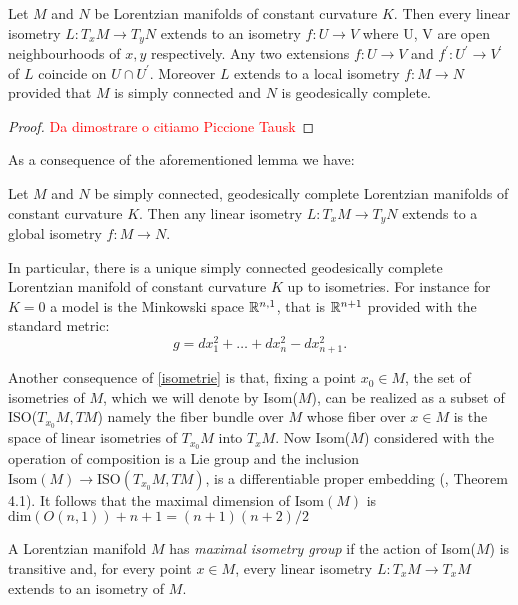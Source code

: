 \begin{lemma}\label{isometrie} Let $M$ and $N$ be Lorentzian manifolds of constant curvature $K$. Then every linear isometry $L:T_{x}M\to T_yN$ extends to an isometry $f:U\to V$ where U, V are open neighbourhoods of $x, y$ respectively. Any two extensions $f:U\to V$ and $f^{\prime}:U^{\prime} \to V^{\prime} $ of $L$ coincide on $U\cap U^{\prime}. $ Moreover $L$ extends to a local isometry $f:M\to N$ provided that $M$ is simply connected and $N$ is geodesically complete. 
\end{lemma}
\begin{proof}

\textcolor{red}{Da dimostrare o citiamo Piccione Tausk}  

\end{proof}

As a consequence of the aforementioned lemma we have: 
\begin{corollary}\label{122}
    Let $M$ and $N$ be simply connected, geodesically complete Lorentzian manifolds of constant curvature $K$. Then any linear isometry $L:T_xM\to T_yN$ extends to a global isometry $f:M\to N.$   
\end{corollary}

In particular, there is a unique simply connected geodesically complete Lorentzian manifold of constant curvature $K$ up to isometries. For instance for $K=0$ a model is the Minkowski space $\mathbb{R}^{n,1}$, that is $\mathbb{R}^{n+1}$ provided with the standard metric: 
\[
    g=dx_1^{2}+\dots+dx_n^{2}-dx_{n+1}^2.   
\]

Another consequence of \ref{isometrie} is that, fixing a point $x_0 \in M$, the set of isometries of $M$, which we will denote by Isom($M$), can be realized as a subset of ISO($T_{x_0}M, TM$) namely the fiber bundle over $M$ whose fiber over $x\in M$ is the space of linear isometries of $T_{x_0}M$ into $T_{x}M$. Now Isom($M$) considered with the operation of composition is a Lie group and the inclusion $\text{Isom}(M)\to \text{ISO}(T_{x_0}M, TM)$, is a differentiable proper embedding (\cite{okubo_1970}, Theorem 4.1). It follows that the maximal dimension of $\text{Isom}(M)$ is $\text{dim}(O(n,1))+n+1=(n+1)(n+2)/2$

\begin{definition}
    A Lorentzian manifold $M$ has \textit{maximal isometry group} if the action of Isom($M$) is transitive and, for every point $x \in M$, every linear isometry $L:T_{x}M\to T_xM$ extends to an isometry of $M$. 
\end{definition}

